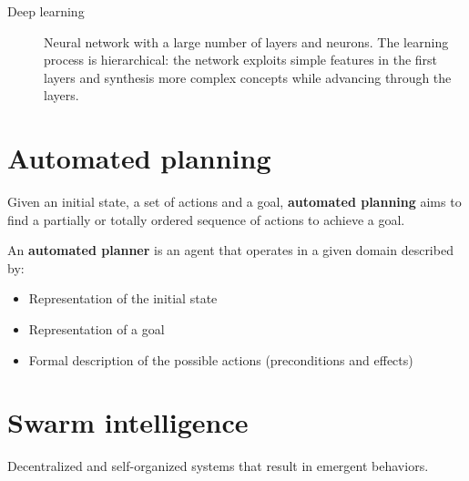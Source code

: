 \begin{description}
    \item[Deep learning] 
        Neural network with a large number of layers and neurons.
        The learning process is hierarchical: the network exploits simple features in the first layers and
        synthesis more complex concepts while advancing through the layers.
\end{description}



\section{Automated planning}
Given an initial state, a set of actions and a goal, 
\textbf{automated planning} aims to find a partially or totally ordered sequence of actions to achieve a goal. 

An \textbf{automated planner} is an agent that operates in a given domain described by:
\begin{itemize}
    \item Representation of the initial state
    \item Representation of a goal
    \item Formal description of the possible actions (preconditions and effects)
\end{itemize}



\section{Swarm intelligence}
Decentralized and self-organized systems that result in emergent behaviors. 
